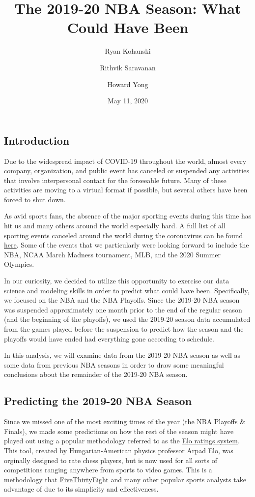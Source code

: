 \documentclass[]{article}
\title{The 2019-20 NBA Season: What Could Have Been}
\author{Ryan Kohanski \and Rithvik Saravanan \and Howard Yong}
\date{May 11, 2020}
\begin{document}
\maketitle

\hypertarget{introduction}{%
\subsection{Introduction}\label{introduction}}

Due to the widespread impact of COVID-19 throughout the world, almost
every company, organization, and public event has canceled or suspended
any activities that involve interpersonal contact for the forseeable
future. Many of these activities are moving to a virtual format if
possible, but several others have been forced to shut down.

As avid sports fans, the absence of the major sporting events during
this time has hit us and many others around the world especially hard. A
full list of all sporting events canceled around the world during the
coronavirus can be found
\href{https://www.espn.com/olympics/story/_/id/28824781/list-sporting-events-canceled-coronavirus}{here}.
Some of the events that we particularly were looking forward to include
the NBA, NCAA March Madness tournament, MLB, and the 2020 Summer
Olympics.

In our curiosity, we decided to utilize this opportunity to exercise our
data science and modeling skills in order to predict what could have
been. Specifically, we focused on the NBA and the NBA Playoffs. Since
the 2019-20 NBA season was suspended approximately one month prior to
the end of the regular season (and the beginning of the playoffs), we
used the 2019-20 season data accumulated from the games played before
the suspension to predict how the season and the playoffs would have
ended had everything gone according to schedule.

In this analysis, we will examine data from the 2019-20 NBA season as
well as some data from previous NBA seasons in order to draw some
meaningful conclusions about the remainder of the 2019-20 NBA season.

\hypertarget{predicting-the-2019-20-nba-season}{%
\subsection{Predicting the 2019-20 NBA
Season}\label{predicting-the-2019-20-nba-season}}

Since we missed one of the most exciting times of the year (the NBA
Playoffs \& Finals), we made some predictions on how the rest of the
season might have played out using a popular methodology referred to as
the \href{https://en.wikipedia.org/wiki/Elo_rating_system}{Elo ratings
system}. This tool, created by Hungarian-American physics professor
Arpad Elo, was orginally designed to rate chess players, but is now used
for all sorts of competitions ranging anywhere from sports to video
games. This is a methodology that
\href{https://fivethirtyeight.com/features/how-we-calculate-nba-elo-ratings/}{FiveThirtyEight}
and many other popular sports analysts take advantage of due to its
simplicity and effectiveness.
\end{document}
